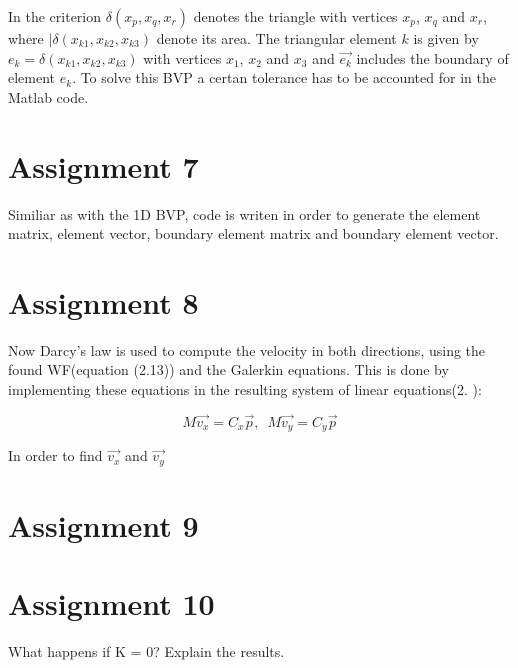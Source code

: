 \documentclass[a4paper]{report}
\begin{document}
In the criterion $\delta(x_p,x_q,x_r)$ denotes the triangle with vertices $x_p$, $x_q$ and $x_r$, where $|\delta(x_{k1},x_{k2},x_{k3})$ denote its area. The triangular element $k$ is given by $e_k=\delta(x_{k1},x_{k2},x_{k3})$ with vertices  $x_1$, $x_2$ and $x_3$ and $\vec{e_k}$ includes the boundary of element $e_k$. To solve this BVP a certan tolerance has to be accounted for in the Matlab code.

\section{Assignment 7}

Similiar as with the 1D BVP, code is writen in order to generate the element matrix, element vector, boundary element matrix and boundary element vector. 




\section{Assignment 8}

Now Darcy's law is used to compute the velocity in both directions, using the found WF(equation (2.13)) and the Galerkin equations. This is done by implementing these equations in the resulting system of linear equations(2. ):

\begin{equation}
 M\vec{v_x}=C_x\vec{p},\,\,\, M\vec{v_y}=C_y\vec{p}
\end{equation}

In order to find $\vec{v_x}$ and $\vec{v_y}$


\section{Assignment 9}



\section{Assignment 10}

What happens if K = 0? Explain the results.
\end{document}
